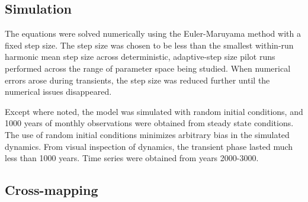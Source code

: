 \documentclass[10pt]{article}
\begin{document}
\subsection{Simulation}

The equations were solved numerically using the Euler-Maruyama method with a fixed step size. 
The step size was chosen to be less than the smallest within-run harmonic mean step size across deterministic, adaptive-step size pilot runs performed across the range of parameter space being studied. 
When numerical errors arose during transients, the step size was reduced further until the numerical issues disappeared.

Except where noted, the model was simulated with random initial conditions, and 1000 years of monthly observations were obtained from steady state conditions.
The use of random initial conditions minimizes arbitrary bias in the simulated dynamics.
From visual inspection of dynamics, the transient phase lasted much less than 1000 years. Time series were obtained from years 2000-3000.


\subsection{Cross-mapping}
\end{document}
